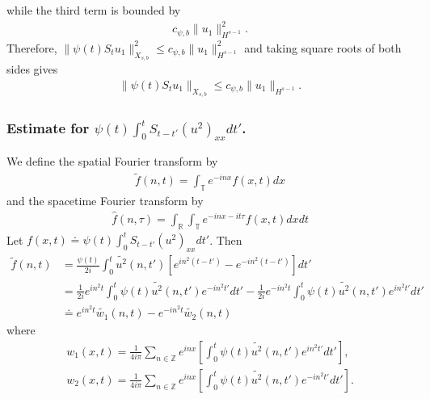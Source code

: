 \documentclass[12pt,reqno]{amsart}
\numberwithin{equation}{section}  %
\numberwithin{figure}{section}
\newcommand{\rr}{\mathbb{R}}
\newcommand{\zz}{\mathbb{Z}}
\newcommand{\ci}{\mathbb{T}}
\newcommand{\wh}{\widehat}
\newcommand{\wt}{\widetilde}
\theoremstyle{plain}
\theoremstyle{definition}
\theoremstyle{remark}
\begin{document}
while the third term is bounded by  
%
%
\begin{equation*}
\begin{split}
  c_{\psi, b} \| u_{1} \|_{H^{s-1}}^{2}.
\end{split}
\end{equation*}
%
%
Therefore, 
$\|\psi(t) S_{t} u_{1}\|_{X_{s,b}}^{2} \le c_{\psi, b}
\|u_{1}\|_{H^{s-1}}^2$ and
taking square roots of both sides gives
%
%
\begin{equation}
  \begin{split}
    \|\psi(t) S_{t} u_{1}\|_{X_{s,b}} \le c_{\psi, b}
    \|u_{1}\|_{H^{s-1}}.
  \end{split}
  \label{eqn:u-1-fin-est}
\end{equation}

\subsubsection{Estimate for $\psi(t) \int_{0}^{t} S_{t-t'} (u^{2})_{xx} dt'$.}
\label{sssec:non-lin-term}
We define the spatial Fourier transform by 
%
%
\begin{equation*}
\begin{split}
  \tilde{f}(n, t) = \int_{\ci} e^{-inx}f(x,t) dx
\end{split}
\end{equation*}
%
%
and the spacetime Fourier transform by
\begin{equation*}
\begin{split}
  \wh{f}(n, \tau) = \int_{\rr} \int_{\ci} e^{-inx-it\tau}f(x,t) dx dt
\end{split}
\end{equation*}
%
%
Let $f(x,t) \doteq \psi(t) \int_{0}^{t} S_{t-t'} (u^{2})_{xx} dt'$. 
Then
%
%
\begin{equation}
  \begin{split}
    \wt{f}(n, t)
    & = \frac{\psi(t)}{2i} \int_{0}^{t}\wt{u^{2}}(n, t') \left[
    e^{in^{2}(t-t')} - e^{-in^{2}(t-t')}
    \right] dt'
    \\
    & = \frac{1}{2i} e^{in^{2}t} \int_{0}^{t} \psi(t) \wt{u^{2}}(n, t') e^{-in^{2}t'}
    dt' - 
    \frac{1}{2i} e^{-in^{2}t} \int_{0}^{t} \psi(t) \wt{u^{2}}(n, t') e^{in^{2}t'} dt'
    \\
    & \doteq e^{in^{2}t} \wt{w_1}(n, t) - e^{-in^{2}t} \wt{w_2}(n, t)
  \end{split}
  \label{space-four-trans}
\end{equation}
%
where
%
%
\begin{gather*}
  w_{1}(x,t) = \frac{1}{4 i \pi} \sum_{n \in \zz} e^{inx} \left[ \int_{0}^{t} \psi(t) \wt{u^{2}}(n, t') e^{in^{2}t'}
  dt'\right],
  \\
  w_{2}(x,t) = \frac{1}{4 i\pi} \sum_{n \in \zz} e^{inx} \left[ \int_{0}^{t} \psi(t) \wt{u^{2}}(n, t') e^{-in^{2}t'} dt'
 \right].
\end{gather*}
\end{document}
